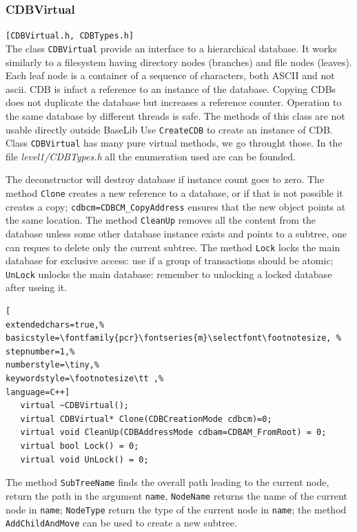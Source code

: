 \subsubsection{CDBVirtual}
\texttt{[CDBVirtual.h, CDBTypes.h]}\\
The class \texttt{CDBVirtual} provide an interface to a hierarchical database. It works similarly to a filesystem having directory nodes (branches) and file nodes (leaves). Each leaf node is a container of a sequence of characters, both ASCII and not ascii. CDB is infact a reference to an instance of the database. Copying CDBs does not duplicate the database but increases a reference counter. Operation to the same database by different threads is safe. The methods of this class are not usable directly outside BaseLib Use \texttt{CreateCDB} to create an instance of CDB. \\


Class \texttt{CDBVirtual} has many pure virtual methods, we go throught those. In the file \textit{level1/CDBTypes.h} all the enumeration used are can be founded.

The deconstructor will destroy database if instance count goes to zero. The method \texttt{Clone} creates a new reference to a database, or if that is not possible it creates a copy; \texttt{cdbcm=CDBCM\_CopyAddress} ensures that the new object points at the same location. The method \texttt{CleanUp} removes all the content from the database unless some other database instance exists and points to a subtree, one can reques to delete only the current subtree.
The method \texttt{Lock} locks the main database for exclusive access: use if a group of transactions should be atomic; \texttt{UnLock} unlocks the main database: remember to unlocking a locked database after useing it.
\begin{lstlisting}[
extendedchars=true,%
basicstyle=\fontfamily{pcr}\fontseries{m}\selectfont\footnotesize, %
stepnumber=1,%
numberstyle=\tiny,%
keywordstyle=\footnotesize\tt ,%
language=C++]
   virtual ~CDBVirtual();
   virtual CDBVirtual* Clone(CDBCreationMode cdbcm)=0;
   virtual void CleanUp(CDBAddressMode cdbam=CDBAM_FromRoot) = 0;
   virtual bool Lock() = 0;
   virtual void UnLock() = 0;
\end{lstlisting}

The method \texttt{SubTreeName} finds the overall path leading to the current node, return the path in the argument \texttt{name}, \texttt{NodeName} returns the name of the current node in \texttt{name}; \texttt{NodeType} return the type of the current node in \texttt{name}; the method \texttt{AddChildAndMove} can be used to create a new subtree.


